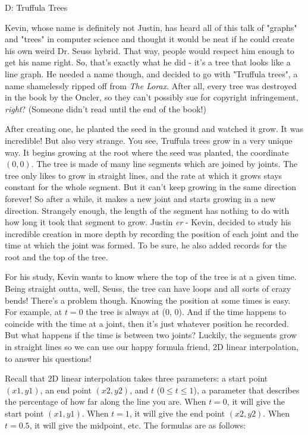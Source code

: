 \begin{problem}{D: Truffula Trees}

Kevin, whose name is definitely not Justin, has heard all of this talk of "graphs" and "trees" in computer science and thought it would be neat if he could create his own weird Dr. Seuss hybrid. That way, people would respect him enough to get his name right. So, that's exactly what he did - it's a tree that looks like a line graph. He needed a name though, and decided to go with "Truffula trees", a name shamelessly ripped off from \textit{The Lorax}. After all, every tree was destroyed in the book by the Oncler, so they can't possibly sue for copyright infringement, \textit{right}? (Someone didn't read until the end of the book!)

After creating one, he planted the seed in the ground and watched it grow. It was incredible! But also very strange. You see, Truffula trees grow in a very unique way. It begins growing at the root where the seed was planted, the coordinate $(0, 0)$. The tree is made of many line segments which are joined by joints. The tree only likes to grow in straight lines, and the rate at which it grows stays constant for the whole segment. But it can't keep growing in the same direction forever! So after a while, it makes a new joint and starts growing in a new direction. Strangely enough, the length of the segment has nothing to do with how long it took that segment to grow. Justin \textit{er} - Kevin, decided to study his incredible creation in more depth by recording the position of each joint and the time at which the joint was formed. To be sure, he also added records for the root and the top of the tree.

For his study, Kevin wants to know where the top of the tree is at a given time. Being straight outta, well, Seuss, the tree can have loops and all sorts of crazy bends! There's a problem though. Knowing the position at some times is easy. For example, at $t = 0$ the tree is always at (0, 0). And if the time happens to coincide with the time at a joint, then it's just whatever position he recorded. But what happens if the time is between two joints? Luckily, the segments grow in straight lines so we can use our happy formula friend, 2D linear interpolation, to answer his questions!

Recall that 2D linear interpolation takes three parameters: a start point $(x1, y1)$, an end point $(x2, y2)$, and $t$ ($0 \leq t \leq 1$), a parameter that describes the percentage of how far along the line you are. When $t = 0$, it will give the start point $(x1, y1)$. When $t = 1$, it will give the end point $(x2, y2)$. When $t = 0.5$, it will give the midpoint, etc. The formulas are as follows:


\end{problem}
